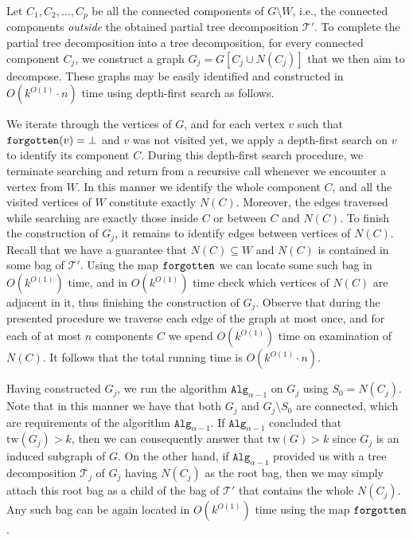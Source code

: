 \documentclass[a4paper,11pt]{article}
\theoremstyle{definition}
\theoremstyle{remark}
\newcommand{\depth}{\alpha}
\newcommand{\alg}[1]{\mathtt{Alg}_{#1}}
\newcommand{\td}{\mathcal{T}} \newcommand{\tw}{\mathrm{tw}} \newcommand{\w}{\mathrm{w}}
\begin{document}
Let $C_1,C_2,\ldots,C_p$ be all the connected components of $G\setminus W$,
i.e., the connected components \emph{outside} the obtained partial
tree decomposition $\td'$.  To complete the partial tree decomposition
into a tree decomposition, for every connected component $C_j$, we
construct a graph $G_j=G[C_j \cup N(C_j)]$ that we then aim to
decompose.  These graphs may be easily identified and constructed in
$O(k^{O(1)}\cdot n)$ time using depth-first search as follows.

We iterate through the vertices of $G$, and for each vertex $v$ such
that $\texttt{forgotten}(v)=\bot$ and $v$ was not visited yet, we apply a
depth-first search on $v$ to identify its component $C$.  During this
depth-first search procedure, we terminate searching and return from a
recursive call whenever we encounter a vertex from $W$.  In this
manner we identify the whole component $C$, and all the visited
vertices of $W$ constitute exactly $N(C)$.  Moreover, the edges
traversed while searching are exactly those inside $C$ or between $C$
and $N(C)$.  To finish the construction of $G_j$, it remains to
identify edges between vertices of $N(C)$.  Recall that we have a
guarantee that $N(C)\subseteq W$ and $N(C)$ is contained in some bag
of $\td'$.  Using the map $\texttt{forgotten}$ we can locate some such bag in
$O(k^{O(1)})$ time, and in $O(k^{O(1)})$ time check which vertices of
$N(C)$ are adjacent in it, thus finishing the construction of $G_j$.
Observe that during the presented procedure we traverse each edge of
the graph at most once, and for each of at most $n$ components $C$ we
spend $O(k^{O(1)})$ time on examination of $N(C)$.  It follows that
the total running time is $O(k^{O(1)}\cdot n)$.



Having constructed $G_j$, we run the algorithm $\alg{\depth-1}$ on
$G_j$ using $S_0=N(C_j)$.  Note that in this manner we have that both
$G_j$ and $G_j\setminus S_0$ are connected, which are requirements of
the algorithm $\alg{\depth-1}$.  If $\alg{\depth-1}$ concluded that
$\tw(G_j)>k$, then we can consequently answer that $\tw(G)>k$ since
$G_j$ is an induced subgraph of $G$.  On the other hand, if
$\alg{\depth-1}$ provided us with a tree decomposition $\td_j$ of
$G_j$ having $N(C_j)$ as the root bag, then we may simply attach this
root bag as a child of the bag of $\td'$ that contains the whole
$N(C_j)$.  Any such bag can be again located in $O(k^{O(1)})$ time
using the map $\texttt{forgotten}$.
\end{document}
